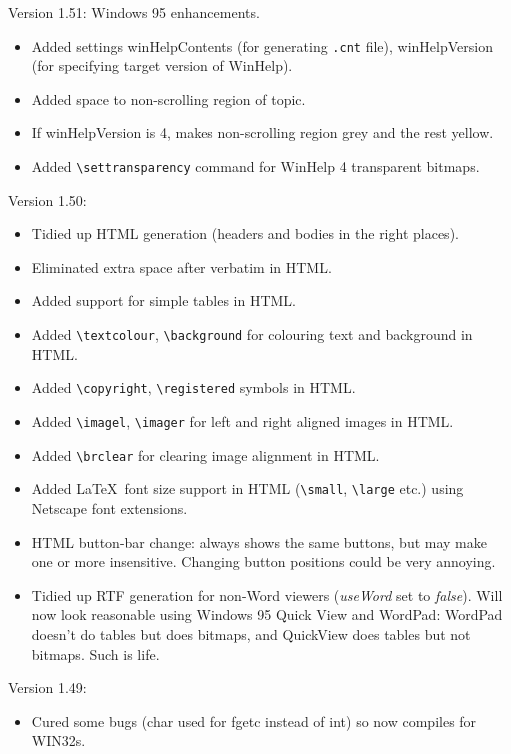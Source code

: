 Version 1.51: Windows 95 enhancements.

\begin{itemize}\itemsep=0pt
\item Added settings winHelpContents (for generating {\tt .cnt} file), winHelpVersion (for specifying
target version of WinHelp).
\item Added space to non-scrolling region of topic.
\item If winHelpVersion is 4, makes non-scrolling region grey and the rest yellow.
\item Added \verb$\settransparency$ command for WinHelp 4 transparent bitmaps.
\end{itemize}

Version 1.50:

\begin{itemize}\itemsep=0pt
\item Tidied up HTML generation (headers and bodies in the right places).
\item Eliminated extra space after verbatim in HTML.
\item Added support for simple tables in HTML.
\item Added \verb$\textcolour$, \verb$\background$ for colouring text and background in HTML.
\item Added \verb$\copyright$, \verb$\registered$ symbols in HTML.
\item Added \verb$\imagel$, \verb$\imager$ for left and right aligned images
in HTML.
\item Added \verb$\brclear$ for clearing image alignment in HTML.
\item Added \LaTeX\ font size support in HTML (\verb$\small$, \verb$\large$ etc.) using Netscape font extensions.
\item HTML button-bar change: always shows the same buttons, but may make one or more insensitive. Changing button positions
could be very annoying.
\item Tidied up RTF generation for non-Word viewers ({\it useWord} set to {\it false}). Will now look reasonable using
Windows 95 Quick View and WordPad: WordPad doesn't do tables but does bitmaps, and QuickView does tables but not
bitmaps. Such is life.
\end{itemize}

Version 1.49:

\begin{itemize}\itemsep=0pt
\item Cured some bugs (char used for fgetc instead of int) so now compiles for
WIN32s.
\end{itemize}

